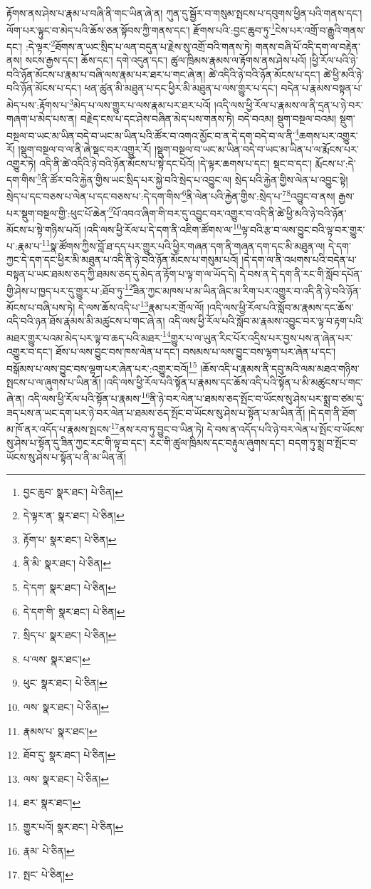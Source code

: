 རྟོགས་ནས་ཤེས་པ་རྣམ་པ་བཞི་ནི་གང་ཡིན་ཞེ་ན། ཀུན་དུ་སྦྱོར་བ་གསུམ་སྤངས་པ་དབུགས་ཕྱིན་པའི་གནས་དང་། ལོག་པར་ལྟུང་བ་མེད་པའི་ཆོས་ཅན་སྟོབས་ཀྱི་གནས་དང་། རྫོགས་པའི་:བྱང་ཆུབ་ཏུ་\footnote{བྱང་ཆུབ་  སྣར་ཐང་།  པེ་ཅིན། }ངེས་པར་འགྲོ་བ་རྒྱུའི་གནས་དང་། :དེ་ལྟར་\footnote{དེ་ལྟར་ན་  སྣར་ཐང་།  པེ་ཅིན། }ཐོགས་ན་ཡང་སྲིད་པ་ལན་བདུན་པ་རྗེས་སུ་འགྲོ་བའི་གནས་ཏེ། གནས་བཞི་པོ་འདི་དག་ལ་བརྟེན་ནས། སངས་རྒྱས་དང་། ཆོས་དང་། དགེ་འདུན་དང་། ཚུལ་ཁྲིམས་རྣམས་ལ་རྟོགས་ནས་ཤེས་པའོ། །ཕྱི་རོལ་པའི་ཉེ་བའི་ཉོན་མོངས་པ་རྣམ་པ་བཞི་ལས་རྣམ་པར་ཐར་པ་གང་ཞེ་ན། ཚེ་འདིའི་ཉེ་བའི་ཉོན་མོངས་པ་དང་། ཚེ་ཕྱི་མའི་ཉེ་བའི་ཉོན་མོངས་པ་དང་། ཕན་ཚུན་མི་མཐུན་པ་དང་ཕྱིར་མི་མཐུན་པ་ལས་གྱུར་པ་དང་། བདེན་པ་རྣམས་བསྟན་པ་མེད་པས་:རྟོགས་པ་\footnote{རྟོག་པ་  སྣར་ཐང་།  པེ་ཅིན། }མེད་པ་ལས་གྱུར་པ་ལས་རྣམ་པར་ཐར་པའོ། །འདི་ལས་ཕྱི་རོལ་པ་རྣམས་ལ་ནི་དྲན་པ་ཉེ་བར་གཞག་པ་མེད་པས་ན། བརྗེད་ངས་པ་དང་ཤེས་བཞིན་མེད་པས་གནས་ཏེ། བདེ་བའམ། སྡུག་བསྔལ་བའམ། སྡུག་བསྔལ་བ་ཡང་མ་ཡིན་བདེ་བ་ཡང་མ་ཡིན་པའི་ཚོར་བ་འགའ་མྱོང་བ་ན་དེ་དག་བདེ་བ་ལ་ནི་\footnote{ནི་མི་  སྣར་ཐང་།  པེ་ཅིན། }ཆགས་པར་འགྱུར་རོ། །སྡུག་བསྔལ་བ་ལ་ནི་ཞེ་སྡང་བར་འགྱུར་རོ། །སྡུག་བསྔལ་བ་ཡང་མ་ཡིན་བདེ་བ་ཡང་མ་ཡིན་པ་ལ་རྨོངས་པར་འགྱུར་ཏེ། འདི་ནི་ཚེ་འདིའི་ཉེ་བའི་ཉོན་མོངས་པ་སྟེ་དང་པོའོ། །དེ་ལྟར་ཆགས་པ་དང་། སྡང་བ་དང་། རྨོངས་པ་:དེ་དག་གིས་\footnote{དེ་དག་  སྣར་ཐང་།  པེ་ཅིན། }ནི་ཚོར་བའི་རྐྱེན་གྱིས་ཡང་སྲིད་པར་སྐྱེ་བའི་སྲེད་པ་འབྱུང་ལ། སྲེད་པའི་རྐྱེན་གྱིས་ལེན་པ་འབྱུང་སྟེ། སྲེད་པ་དང་བཅས་པ་ལེན་པ་དང་བཅས་པ་:དེ་དག་གིས་\footnote{དེ་དག་གི་  སྣར་ཐང་།  པེ་ཅིན། }ནི་ལེན་པའི་རྐྱེན་གྱིས་:སྲེད་པ་\footnote{སྲིད་པ་  སྣར་ཐང་།  པེ་ཅིན། }\footnote{པ་ལས་  སྣར་ཐང་། }འབྱུང་བ་ནས། རྒྱས་པར་སྡུག་བསྔལ་གྱི་:ཕུང་པོ་ཆེན་\footnote{ཕུང་  སྣར་ཐང་།  པེ་ཅིན། }པོ་འབའ་ཞིག་གི་བར་དུ་འབྱུང་བར་འགྱུར་བ་འདི་ནི་ཚེ་ཕྱི་མའི་ཉེ་བའི་ཉོན་མོངས་པ་སྟེ་གཉིས་པའོ། །འདི་ལས་ཕྱི་རོལ་པ་དེ་དག་ནི་འཇིག་ཚོགས་ལ་\footnote{ལས་  སྣར་ཐང་།  པེ་ཅིན། }ལྟ་བའི་རྩ་བ་ལས་བྱུང་བའི་ལྟ་བར་གྱུར་པ་:རྣམ་པ་\footnote{རྣམས་པ་  སྣར་ཐང་། }སྣ་ཚོགས་ཀྱིས་བློ་ཐ་དད་པར་གྱུར་པའི་ཕྱིར་གཞན་དག་ནི་གཞན་དག་དང་མི་མཐུན་ལ། དེ་དག་ཀྱང་དེ་དག་དང་ཕྱིར་མི་མཐུན་པ་འདི་ནི་ཉེ་བའི་ཉོན་མོངས་པ་གསུམ་པའོ། །དེ་དག་ལ་ནི་འཕགས་པའི་བདེན་པ་བསྟན་པ་ཡང་ཐམས་ཅད་ཀྱི་ཐམས་ཅད་དུ་མེད་ན་རྟོག་པ་ལྟ་ག་ལ་ཡོད་དེ། དེ་བས་ན་དེ་དག་ནི་རང་གི་སློབ་དཔོན་གྱི་ཤེས་པ་ཁྱད་པར་དུ་གྱུར་པ་:ཐོབ་ཏུ་\footnote{ཐོབ་དུ་  སྣར་ཐང་།  པེ་ཅིན། }ཟིན་ཀྱང་མཁས་པ་མ་ཡིན་ཞིང་མ་རིག་པར་འགྱུར་བ་འདི་ནི་ཉེ་བའི་ཉོན་མོངས་པ་བཞི་པས་ཏེ། དེ་ལས་ཆོས་འདི་པ་\footnote{ལས་  སྣར་ཐང་།  པེ་ཅིན། }རྣམ་པར་གྲོལ་ལོ། །འདི་ལས་ཕྱི་རོལ་པའི་སློབ་མ་རྣམས་དང་ཆོས་འདི་བའི་ཉན་ཐོས་རྣམས་མི་མཚུངས་པ་གང་ཞེ་ན། འདི་ལས་ཕྱི་རོལ་པའི་སློབ་མ་རྣམས་འབྱུང་བར་ལྟ་བ་རྟག་པའི་མཐར་གྱུར་པའམ་མེད་པར་ལྟ་བ་ཆད་པའི་མཐར་\footnote{ཐར་  སྣར་ཐང་། }གྱུར་པ་ལ་ཡུན་རིང་པོར་འདྲིས་པར་བྱས་པས་ན་ཞེན་པར་འགྱུར་བ་དང་། ཐོས་པ་ལས་བྱུང་བས་ཁས་ལེན་པ་དང་། བསམས་པ་ལས་བྱུང་བས་ལྷག་པར་ཞེན་པ་དང་། བསྒོམས་པ་ལས་བྱུང་བས་ལྷག་པར་ཞེན་པར་:འགྱུར་བའོ།\footnote{གྱུར་པའོ།  སྣར་ཐང་།  པེ་ཅིན། } །ཆོས་འདི་པ་རྣམས་ནི་དབུ་མའི་ལམ་མཐའ་གཉིས་སྤངས་པ་ལ་ཞུགས་པ་ཡིན་ནོ། །འདི་ལས་ཕྱི་རོལ་པའི་སྟོན་པ་རྣམས་དང་ཆོས་འདི་པའི་སྟོན་པ་མི་མཚུངས་པ་གང་ཞེ་ན། འདི་ལས་ཕྱི་རོལ་པའི་སྟོན་པ་རྣམས་\footnote{རྣམ་  པེ་ཅིན། }ནི་ཉེ་བར་ལེན་པ་ཐམས་ཅད་སྤོང་བ་ཡོངས་སུ་ཤེས་པར་སྨྲ་བ་ཙམ་དུ་ཟད་པས་ན་ཡང་དག་པར་ཉེ་བར་ལེན་པ་ཐམས་ཅད་སྤོང་བ་ཡོངས་སུ་ཤེས་པ་སྟོན་པ་མ་ཡིན་ནོ། །དེ་དག་ནི་ཐོག་མ་ཁོ་ནར་འདོད་པ་རྣམས་སྤངས་\footnote{སྤང་  པེ་ཅིན། }ནས་རབ་ཏུ་བྱུང་བ་ཡིན་ཏེ། དེ་བས་ན་འདོད་པའི་ཉེ་བར་ལེན་པ་སྤོང་བ་ཡོངས་སུ་ཤེས་པ་སྟོན་དུ་ཟིན་ཀྱང་རང་གི་ལྟ་བ་དང་། རང་གི་ཚུལ་ཁྲིམས་དང་བརྟུལ་ཞུགས་དང་། བདག་ཏུ་སྨྲ་བ་སྤོང་བ་ཡོངས་སུ་ཤེས་པ་སྟོན་པ་ནི་མ་ཡིན་ནོ། 